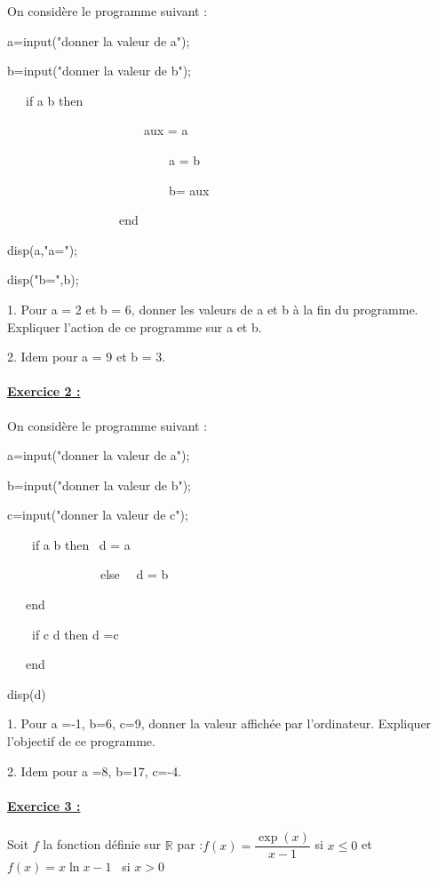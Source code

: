 \documentclass{article}
\begin{document}
On consid\`{e}re le programme suivant :

a=input("donner la valeur de a");

b=input("donner la valeur de b");

\ \ \ if a \TEXTsymbol{<} b then

\ \ \ \ \ \ \ \ \ \ \ \ \ \ \ \ \ \ \ \ \ \ aux = a

\ \ \ \ \ \ \ \ \ \ \ \ \ \ \ \ \ \ \ \ \ \ \ \ \ \ a = b

\ \ \ \ \ \ \ \ \ \ \ \ \ \ \ \ \ \ \ \ \ \ \ \ \ \ b= aux

\ \ \ \ \ \ \ \ \ \ \ \ \ \ \ \ \ \ end

disp(a,"a=");

disp("b=",b);

1. Pour a = 2 et b = 6, donner les valeurs de a et b \`{a} la fin du
programme. Expliquer l'action de ce programme sur a et b.

2. Idem pour a = 9 et b = 3.

\paragraph{\protect\underline{Exercice 2 :}}

On consid\`{e}re le programme suivant :

a=input("donner la valeur de a");

b=input("donner la valeur de b");

c=input("donner la valeur de c");

\ \ \ \ if a \TEXTsymbol{>} b then \ d = a

\ \ \ \ \ \ \ \ \ \ \ \ \ \ \ else \ \ d = b

\ \ \ end

\ \ \ \ if c \TEXTsymbol{>} d then d =c

\ \ \ end

disp(d)

1. Pour a =-1, b=6, c=9, donner la valeur affich\'{e}e par l'ordinateur.
Expliquer l'objectif de ce programme.\ \ \ 

2. Idem pour a =8, b=17, c=-4.

\paragraph{\protect\underline{Exercice 3 :}}

Soit $f$ la fonction d\'{e}finie sur $\mathbb{R}$ par :$f(x)=\dfrac{\exp (x)%
}{x-1}$ si $x\leq 0$ et $f(x)=x\ln x-1$ \ si $x>0$
\end{document}
